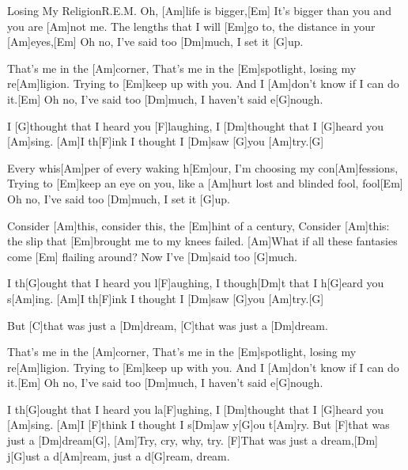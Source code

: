 \documentclass[../main.tex]{subfiles}
\begin{document}
\begin{song}{Losing My Religion}{R.E.M.}{}
Oh, [Am]life is bigger,[Em]{\hh}
It's bigger than you and you are [Am]not me.
The lengths that I will [Em]go to, the distance in your [Am]eyes,[Em]{\hh}
Oh no, I've said too [Dm]much, I set it [G]up.

That's me in the [Am]corner, 
That's me in the [Em]spotlight, losing my re[Am]ligion.
Trying to [Em]keep up with you. And I [Am]don't know if I can do it.[Em]{\hh}
Oh no, I've said too [Dm]much, I haven't said e[G]nough.

I [G]thought that I heard you [F]laughing, I [Dm]thought that I [G]heard you [Am]sing.
[Am]I th[F]ink I thought I [Dm]saw [G]you [Am]try.[G]{\hh}

Every whis[Am]per of every waking h[Em]our, I'm choosing my con[Am]fessions,
Trying to [Em]keep an eye on you, like a [Am]hurt lost and blinded fool, fool[Em]{\hh}
Oh no, I've said too [Dm]much, I set it [G]up.

Consider [Am]this, consider this, the [Em]hint of a century,
Consider [Am]this: the slip that [Em]brought me to my knees failed.
[Am]What if all these fantasies come [Em] flailing around?
Now I've [Dm]said too [G]much.

I th[G]ought that I heard you l[F]aughing, I though[Dm]t that I h[G]eard you s[Am]ing.
[Am]I  th[F]ink I thought I [Dm]saw [G]you [Am]try.[G]{\hh}

But [C]that was just a [Dm]dream, [C]that was just a [Dm]dream.

That's me in the [Am]corner, 
That's me in the [Em]spotlight, losing my re[Am]ligion.
Trying to [Em]keep up with you. And I [Am]don't know if I can do it.[Em]{\hh}
Oh no, I've said too [Dm]much, I haven't said e[G]nough.

I th[G]ought that I heard you la[F]ughing, I [Dm]thought that I [G]heard you [Am]sing.
[Am]I  [F]think I thought I s[Dm]aw y[G]ou t[Am]ry.
But [F]that was just a [Dm]dream[G],
[Am]Try, cry, why, try.
[F]That was just a dream,[Dm] j[G]ust a d[Am]ream, just a d[G]ream, dream.
\end{song}
\end{document}
